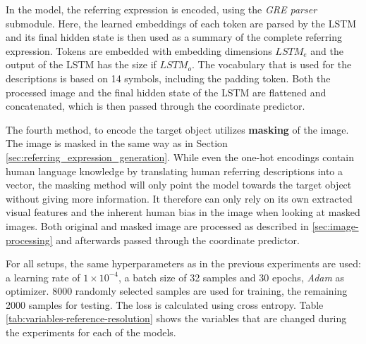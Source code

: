 In the model, the referring expression is encoded, using the \emph{GRE parser} submodule.
Here, the learned embeddings of each token are parsed by the LSTM and its final hidden state is then used as a summary of the complete referring expression.
Tokens are embedded with embedding dimensions $LSTM_e$ and the output of the LSTM has the size if $LSTM_o$.
The vocabulary that is used for the descriptions is based on 14 symbols, including the padding token.
Both the processed image and the final hidden state of the LSTM are flattened and concatenated, which is then passed through the coordinate predictor.

The fourth method, to encode the target object utilizes \textbf{masking} of the image.
The image is masked in the same way as in Section \ref{sec:referring_expression_generation}.
While even the one-hot encodings contain human language knowledge by translating human referring descriptions into a vector, the masking method will only point the model towards the target object without giving more information.
It therefore can only rely on its own extracted visual features and the inherent human bias in the image when looking at masked images.
Both original and masked image are processed as described in \ref{sec:image-processing} and afterwards passed through the coordinate predictor.

For all setups, the same hyperparameters as in the previous experiments are used: a learning rate of $1\times10^{-4}$, a batch size of 32 samples and 30 epochs, \emph{Adam} \citep{Kingma2015} as optimizer.
8000 randomly selected samples are used for training, the remaining 2000 samples for testing.
The loss is calculated using cross entropy.
Table \ref{tab:variables-reference-resolution} shows the variables that are changed during the experiments for each of the models.

